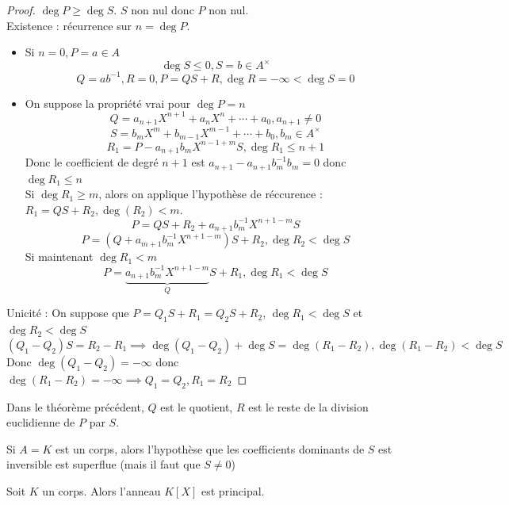 \documentclass[]{report}
\begin{document}
    \begin{proof}
        $\deg P\ge \deg S$. $S$ non nul donc $P$ non nul.\\
        Existence : récurrence sur $n=\deg P$.
        \begin{itemize}
            \item Si $n=0,P=a\in A$
            \[\deg S \le 0, S=b\in A^{\times}\]
            \[Q=ab^{-1}, R=0,P=QS+R,\deg R=-\infty<\deg S=0 \]
            \item On suppose la propriété vrai pour $\deg P=n$
            \[Q=a_{n+1}X^{n+1}+a_n X^n+\cdots +a_0,a_{n+1}\neq 0\]
            \[S=b_m X^m+b_{m-1}X^{m-1}+\cdots+b_0,b_m\in A^{\times}\]
            \[R_1=P-a_{n+1}b_mX^{n-1+m}S,\deg R_1\le n+1\]
            Donc le coefficient de degré $n+1$ est $a_{n+1}-a_{n+1}b_m^{-1}b_m=0$ donc $\deg R_1\le n$\\
            Si $\deg R_1\ge m$, alors on applique l'hypothèse de réccurence : $R_1=QS+R_2,\deg (R_2)<m$.
            \[P=QS+R_2+a_{n+1} b_m^{-1} X^{n+1-m}S\]
            \[P=(Q+a_{m+1}b_m^{-1}X^{n+1-m})S+R_2,\deg R_2<\deg S\]
            Si maintenant $\deg R_1<m$
            \[P=\underset{Q}{\underbrace{a_{n+1}b_m^{-1}X^{n+1-m}}}S+ R_1, \deg R_1< \deg S\]
        \end{itemize}
        Unicité : On suppose que $P=Q_1 S+ R_1=Q_2 S +R_2$, $\deg R_1<\deg S$ et $\deg R_2<\deg S$
        \[(Q_1-Q_2)S=R_2-R_1\implies \deg (Q_1-Q_2)+\deg S=\deg (R_1-R_2), \deg (R_1-R_2)<\deg S\]
        Donc $\deg(Q_1-Q_2)=-\infty$ donc $\deg (R_1-R_2)=-\infty\implies Q_1=Q_2,R_1=R_2$
    \end{proof}

    \begin{not}{}{}
        Dans le théorème précédent, $Q$ est le quotient, $R$ est le reste de la division euclidienne de $P$ par $S$.
    \end{not}

    \begin{re}{}{}
        Si $A=K$ est un corps, alors l'hypothèse que les coefficients dominants de $S$ est inversible est superflue (mais il faut que $S\neq 0$)
    \end{re}

    \begin{prop}{}{}
        Soit $K$ un corps. Alors l'anneau $K[X]$ est principal.
    \end{prop}
\end{document}

